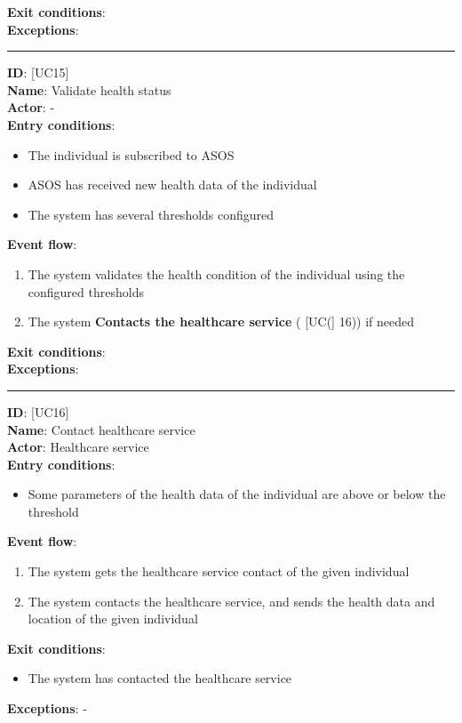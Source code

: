 \documentclass[hidelinks, 12pt]{report}
\newcommand\usecase[1]{ [UC#1] }
\begin{document}
\begin{itemize}
		\textbf{Exit conditions}: \\
		\textbf{Exceptions}: \\
		\rule{\linewidth}{0.4pt}
		\textbf{ID}: \usecase{15} \\
		\textbf{Name}: Validate health status \\
		\textbf{Actor}: - \\
		\textbf{Entry conditions}:
		\begin{itemize}
			\item{The individual is subscribed to ASOS}
			\item{ASOS has received new health data of the individual}
			\item{The system has several thresholds configured}
		\end{itemize}
		\textbf{Event flow}:
		\begin{enumerate}
			\item{The system validates the health condition of the individual using the configured thresholds}
			\item{The system \textbf{Contacts the healthcare service} (\usecase(16)) if needed}
		\end{enumerate}
		\textbf{Exit conditions}: \\
		\textbf{Exceptions}: \\
		\rule{\linewidth}{0.4pt}
		\textbf{ID}: \usecase{16} \\
		\textbf{Name}: Contact healthcare service \\
		\textbf{Actor}: Healthcare service \\
		\textbf{Entry conditions}:
		\begin{itemize}
			\item{Some parameters of the health data of the individual are above or below the threshold}
		\end{itemize}
		\textbf{Event flow}:
		\begin{enumerate}
			\item{The system gets the healthcare service contact of the given individual}
			\item{The system contacts the healthcare service, and sends the health data and location of the given individual}
		\end{enumerate}
		\textbf{Exit conditions}:
		\begin{itemize}
			\item{The system has contacted the healthcare service}
		\end{itemize}
		\textbf{Exceptions}: - \\

\end{itemize}
\end{document}
